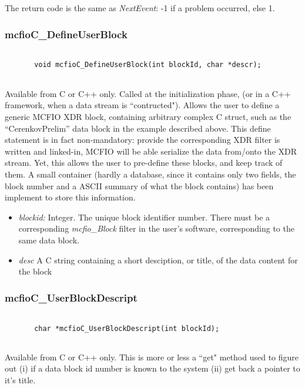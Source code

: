 The return code is the same as {\em NextEvent}: -1 if a problem occurred,
else 1.
 
\subsubsection{mcfioC\_DefineUserBlock} 

\begin{verbatim}
  
       void mcfioC_DefineUserBlock(int blockId, char *descr);
       
\end{verbatim}
 
	Available from C or C++ only. Called at the initialization phase,  (or
in a C++ framework, when a data stream is ``contructed"). Allows the user to
define a generic MCFIO XDR block, containing arbitrary complex C struct, such
as the ``CerenkovPrelim'' data block in the example described above. This
define statement is in fact  non-mandatory: provide the corresponding XDR
filter is written and linked-in,  MCFIO will be able serialize the data
from/onto the XDR stream. Yet, this  allows the user to pre-define these
blocks, and keep track of them. A small  container (hardly a database, since it
contains only two fields, the block number and a ASCII summary of what the
block contains) has been implement  to store this information. 

\begin{itemize} 
\item{\em blockid:} Integer. The unique block identifier number. There must be a
corresponding {\em mcfio\_Block} filter in the user's software, corresponding to
the same data block.
\item {\em desc} A C string containing a short desciption, or title, of the data
content for the block 
\end{itemize}

\subsubsection{mcfioC\_UserBlockDescript} 

\begin{verbatim}
  
       char *mcfioC_UserBlockDescript(int blockId);
       
\end{verbatim}
 

	Available from C or C++ only.  This is more or less a ``get" method 
used to figure out (i) if a data block id number is known to the system 
(ii) get back a pointer to it's title.
  
